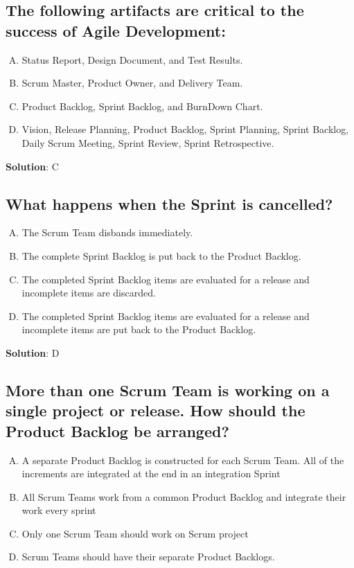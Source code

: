 \subsection{The following artifacts are critical to the success of Agile Development:}
\begin{enumerate}[A)]
  \item Status Report, Design Document, and Test Results.
  \item Scrum Master, Product Owner, and Delivery Team.
  \item Product Backlog, Sprint Backlog, and BurnDown Chart.
  \item Vision, Release Planning, Product Backlog, Sprint Planning, Sprint Backlog, Daily Scrum Meeting, Sprint Review, Sprint Retrospective.
\end{enumerate}


\textbf{Solution}: C


\subsection{What happens when the Sprint is cancelled?}
\begin{enumerate}[A)]
  \item The Scrum Team disbands immediately.
  \item The complete Sprint Backlog is put back to the Product Backlog.
  \item The completed Sprint Backlog items are evaluated for a release and incomplete items are discarded.
  \item The completed Sprint Backlog items are evaluated for a release and incomplete items are put back to the Product Backlog.
\end{enumerate}


\textbf{Solution}: D


\subsection{More than one Scrum Team is working on a single project or release. How should the Product Backlog be arranged? }
\begin{enumerate}[A)]
  \item A separate Product Backlog is constructed for each Scrum Team. All of the increments are integrated at the end in an integration Sprint
  \item All Scrum Teams work from a common Product Backlog and integrate their work every sprint
  \item Only one Scrum Team should work on Scrum project
  \item Scrum Teams should have their separate Product Backlogs.
\end{enumerate}


